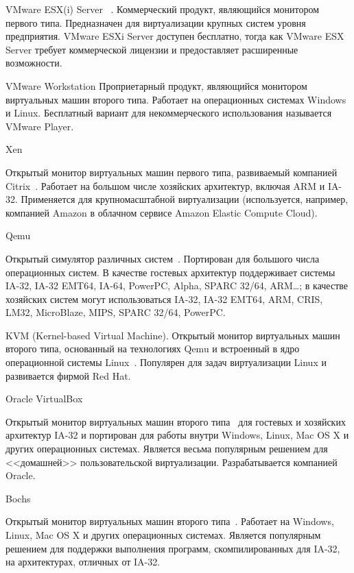 \begin{description*}

\item [VMware ESX(i) Server]~\cite{vmware-esx}. Коммерческий продукт, являющийся монитором первого типа.  Предназначен для виртуализации крупных систем уровня предприятия. VMware ESXi Server доступен бесплатно, тогда как VMware ESX Server требует коммерческой лицензии и предоставляет расширенные возможности.

\item [VMware Workstation] Проприетарный продукт, являющийся монитором виртуальных машин второго типа. Работает на операционных системах Windows и Linux. Бесплатный вариант для некоммерческого использования называется VMware Player.

\item[Xen]

Открытый монитор виртуальных машин первого типа, развиваемый компанией Citrix~\cite{xen2006}. Работает на большом числе хозяйских архитектур, включая ARM и IA-32. Применяется для крупномасштабной виртуализации (используется, например, компанией Amazon в облачном сервисе Amazon Elastic Compute Cloud). 

\item[Qemu]

Открытый симулятор различных систем~\cite{qemu}. Портирован для большого числа операционных систем.
В качестве гостевых архитектур поддерживает системы IA-32, IA-32 EMT64, IA-64, PowerPC, Alpha, SPARC 32/64, ARM\dots; в качестве хозяйских систем могут использоваться IA-32, IA-32 EMT64, ARM, CRIS, LM32, MicroBlaze, MIPS, SPARC 32/64, PowerPC. 

\item[KVM] (\abbr Kernel-based Virtual Machine). Открытый монитор виртуальных машин второго типа, основанный на технологиях Qemu и встроенный в ядро операционной системы Linux~\cite{kvm-wiki}. Популярен для задач виртуализации Linux и развивается фирмой Red Hat.

\item[Oracle VirtualBox]

Открытый монитор виртуальных машин второго типа~\cite{virtualbox} для гостевых и хозяйских архитектур IA-32 и портирован для работы внутри Windows, Linux, Mac OS X и других операционных системах. Является весьма популярным решением для <<домашней>> пользовательской виртуализации. Разрабатывается компанией Oracle.

\item[Bochs]

Открытый монитор виртуальных машин второго типа~\cite{bochs}. Работает на Windows, Linux, Mac OS X и других операционных системах. Является популярным решением для поддержки выполнения программ, скомпилированных для IA-32, на архитектурах, отличных от IA-32.

\end{description*}

